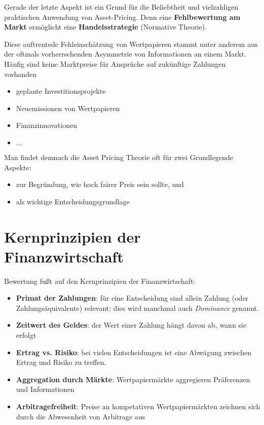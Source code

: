 \documentclass[12pt]{extreport} %
\theoremstyle{named}
\theoremstyle{nnamed}
\theoremstyle{itshape}
\theoremstyle{normal}
\begin{document}
Gerade der letzte Aspekt ist ein Grund für die Beliebtheit und vielzahligen praktischen Anwendung von Asset-Pricing. Denn eine \textbf{Fehlbewertung am Markt} ermöglicht eine \textbf{Handelsstrategie} (Normative Theorie). ~\bigskip

Diese auftrentede Fehleinschätzung von Wertpapieren stammt unter anderem aus der oftmals vorherrschenden Asymmetrie von Informationen an einem Markt. Häufig sind keine Marktpreise für Ansprüche auf zukünftige Zahlungen vorhanden
\begin{itemize}
	\item geplante Investitionsprojekte
	\item Neuemissionen von Wertpapieren
	\item Finanzinnovationen
	\item $\dotsc$
\end{itemize}

Man findet demnach die Asset Pricing Theorie oft für zwei Grundlegende Aspekte:
\begin{itemize}
	\item zur Begründung, wie hoch fairer Preis sein sollte, und
	\item als wichtige Entscheidungsgrundlage
\end{itemize}

\section{Kernprinzipien der Finanzwirtschaft}
Bewertung fußt auf den Kernprinzipien der Finanzwirtschaft:
\begin{itemize}
	\item \textbf{Primat der Zahlungen}: für eine Entscheidung sind allein Zahlung (oder Zahlungsäquivalente) relevant; dies wird manchmal auch \textit{Dominance} genannt.
	\item \textbf{Zeitwert des Geldes}: der Wert einer Zahlung hängt davon ab, wann sie erfolgt
	\item \textbf{Ertrag vs. Risiko}: bei vielen Entscheidungen ist eine Abwägung zwischen Ertrag und Risiko zu treffen.
	\item \textbf{Aggregation durch Märkte}: Wertpapiermärkte aggregieren Präferenzen und Informationen
	\item \textbf{Arbitragefreiheit}: Preise an kompetativen Wertpapiermärkten zeichnen sich durch die Abwesenheit von Arbitrage aus
\end{itemize}
\end{document}
